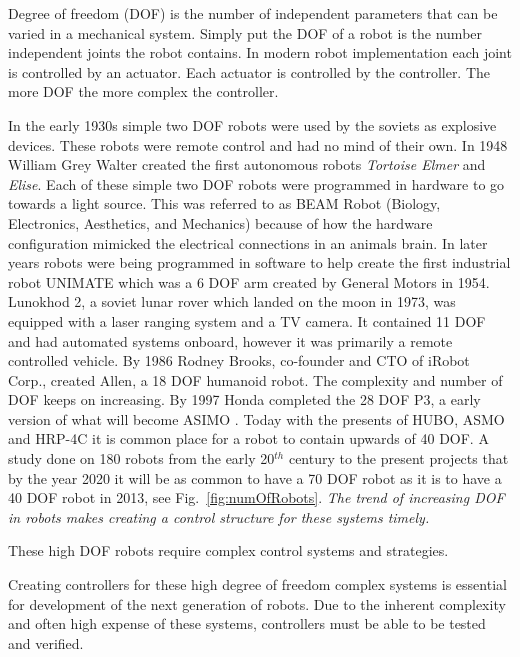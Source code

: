 Degree of freedom (DOF) is the number of independent parameters that can be varied in a mechanical system.
Simply put the DOF of a robot is the number independent joints the robot contains.
In modern robot implementation each joint is controlled by an actuator.
Each actuator is controlled by the controller.
The more DOF the more complex the controller.

In the early 1930s simple two DOF robots were used by the soviets as explosive devices\cite{robotTelitankSpringer2013military}.
These robots were remote control and had no mind of their own.
In 1948 William Grey Walter created the first autonomous robots \textit{Tortoise Elmer} and \textit{Elise}\cite{robotElmer}.
Each of these simple two DOF robots were programmed in hardware to go towards a light source.  
This was referred to as BEAM Robot (Biology, Electronics, Aesthetics, and Mechanics) because of how the hardware configuration mimicked the electrical connections in an animals brain.
In later years robots were being programmed in software to help create the first industrial robot UNIMATE which was a 6 DOF arm created by General Motors in 1954\cite{handbookOnRobotics2008springer}.  
Lunokhod 2, a soviet lunar rover which landed on the moon in 1973, was equipped with a laser ranging system and a TV camera.
It contained 11 DOF and had automated systems onboard, however it was primarily a remote controlled vehicle.
By 1986 Rodney Brooks, co-founder and CTO of iRobot Corp., created Allen, a 18 DOF humanoid robot.
The complexity and number of DOF keeps on increasing.
By 1997 Honda completed the 28 DOF P3, a early version of what will become ASIMO \cite{robotsAsimo1041641}.
Today with the presents of HUBO, ASMO and HRP-4C it is common place for a robot to contain upwards of 40 DOF.
A study done on 180 robots from the early 20$^{th}$ century to the present projects that by the year 2020 it will be as common to have a 70 DOF robot as it is to have a 40 DOF robot in 2013, see Fig.~\ref{fig:numOfRobots}. 
\textit{The trend of increasing DOF in robots makes creating a control structure for these systems timely.}


These high DOF robots require complex control systems and strategies.



Creating controllers for these high degree of freedom complex systems is essential for development of the next generation of robots.
Due to the inherent complexity and often high expense of these systems, controllers must be able to be tested and verified.



